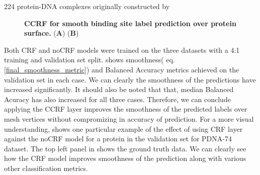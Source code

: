 224 protein-DNA complexes originally constructed by \citet{li2013predna}\\ \begin{center}
        \begin{figure}
        \caption[CCRF for smooth binding site label prediction over protein surface.]{\textbf{CCRF
        for smooth binding site label prediction over protein surface.} ({\bf A}) ({\bf B}) }
        \label{fig:ccrf} \end{figure} \end{center}

Both CRF and noCRF models were trained on the three datasets with a 4:1 training and validation set
        split.  shows smoothness( eq.
        \ref{final_smoothness_metric}) and Balanced Accuracy  metrics achieved on the validation set
        in each case. We can clearly the smoothness of the predictions have increased significantly.
        It should also be noted that that, median Balanced Acuracy has also increased for all three
        cases. Therefore, we can conclude applying the CCRF layer improves the smoothness of the
        predicted labels over mesh vertices without compromizing in accuracy of prediction. For a
        more visual understanding,  shows one particular example
        of the effect of using CRF layer against the noCRF model for a protein in the validation set
        for PDNA-74 dataset. The top left panel in  shows the
        ground truth data. We can clearly see how the CRF model improves smoothness of the
        prediction along with various other classification metrics.


